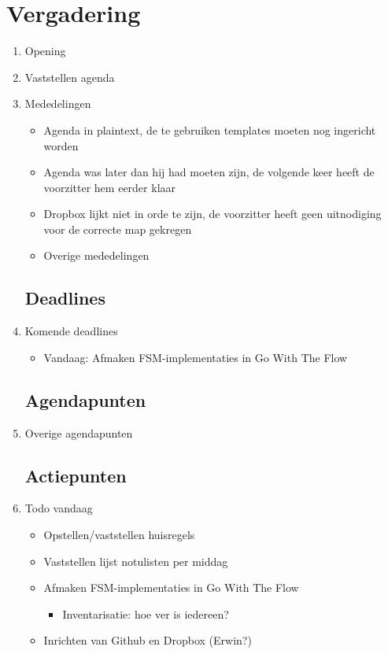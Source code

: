 \documentclass{article}
\begin{document}
\section*{Vergadering}
\begin{enumerate}
	
	\subsection*{Vooraf}
	\item Opening
	\item Vaststellen agenda
	\item Mededelingen
	\begin{itemize}
		\item Agenda in plaintext, de te gebruiken templates moeten nog ingericht worden
		\item Agenda was later dan hij had moeten zijn, de volgende keer heeft de voorzitter hem eerder klaar
		\item Dropbox lijkt niet in orde te zijn, de voorzitter heeft geen uitnodiging voor de correcte map gekregen
		\item Overige mededelingen
	\end{itemize}

	\subsection*{Deadlines}
	\item Komende deadlines
	\begin{itemize}
		\item Vandaag: Afmaken FSM-implementaties in Go With The Flow
	\end{itemize}

	\subsection*{Agendapunten}
	\item Overige agendapunten
	

	\subsection*{Actiepunten}
	\item Todo vandaag
	\begin{itemize}
		\item Opstellen/vaststellen huisregels
		\item Vaststellen lijst notulisten per middag
		\item Afmaken FSM-implementaties in Go With The Flow
		\begin{itemize}
			\item Inventarisatie: hoe ver is iedereen?
		\end{itemize}
		\item Inrichten van Github en Dropbox (Erwin?)
	\end{itemize}


\end{enumerate}
\end{document}

